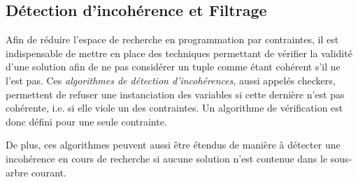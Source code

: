 \subsection{Détection d'incohérence et Filtrage}
\label{sec:PPC_propag}

Afin de réduire l'espace de recherche en programmation par contraintes,
il est indispensable de mettre en place des techniques permettant de
vérifier la validité d'une solution afin de ne pas considérer un tuple
comme étant cohérent s'il ne l'est pas. Ces {\it algorithmes de
détection d'incohérences}, aussi appelés checkers, permettent de
refuser une instanciation des variables si cette dernière n'est pas
cohérente, i.e. si elle viole un des contraintes. Un algorithme de
vérification est donc défini pour une seule contrainte. 

De plus, ces algorithmes peuvent aussi être étendus de manière à détecter une incohérence en
cours de recherche si aucune solution n'est contenue dans le sous-arbre
courant.

